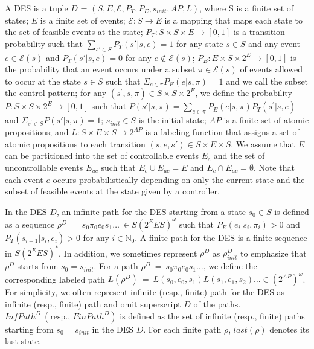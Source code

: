 \begin{definition}
A DES is a tuple $D$ = $(S, E, \mathcal{E}, P_T, P_E, s_{init}, AP, L)$, where S is a finite set of states; $E$ is a finite set of events; $\mathcal{E} : S \rightarrow E$ is a mapping that maps each state to the set of feasible events at the state; $P_T:S \times S \times E \rightarrow [0,1]$ is a transition probability such that $\sum_{s' \in S} P_T(s'|s,e) = 1$ for any state $s \in S$ and any event $e \in \mathcal{E}(s) $ and $P_T(s'|s,e) = 0$ for any $e \notin \mathcal{E}(s)$; $P_E : E \times S \times 2^E \rightarrow [0,1]$ is the probability that an event occurs under a subset $\pi \in \mathcal{E}(s)$ of events allowed to occur at the state $s \in S$ such that $\Sigma_{e \in \pi} P_E(e|s,\pi) = 1$ and we call the subset the control pattern; for any $(s^{\prime}, s, \pi) \in S \times S \times 2^E$, we define the probability $P : S \times S \times 2^{E} \rightarrow [0,1]$ such that $P(s'|s,\pi) = \sum_{e \in \pi}P_E(e|s,\pi) P_T(s^{\prime}|s,e)$ and $\Sigma_{s^{\prime} \in S} P(s'|s,\pi) = 1$; $s_{init} \in S$ is the initial state; $AP$ is a finite set of atomic propositions; and $L : S \times E \times S \rightarrow 2^{AP}$ is a labeling function that assigns a set of atomic propositions to each transition $(s, e, s') \in S \times E \times S$. We assume that $E$ can be partitioned into the set of controllable events $E_c$ and the set of uncontrollable events $E_{uc}$ such that $E_c \cup E_{uc} = E$ and $E_c \cap E_{uc} = \emptyset$. Note that each event $e$ occurs probabilistically depending on only the current state and the subset of feasible events at the state given by a controller.



In the DES $D$, an infinite path for the DES starting from a state $s_0 \in S$ is defined as a sequence $\rho^D\ =\ s_0\pi_0e_0s_1 \ldots\ \in S (2^E E S)^{\omega}$ such that $P_E(e_i|s_i, \pi_i) > 0$ and $P_T(s_{i+1}|s_i, e_i) > 0$ for any $ i \in \mathbb{N}_0$. A finite path for the DES is a finite sequence in $S (2^E E S)^*$. In addition, we sometimes represent $\rho^D$ as $\rho^D_{init}$ to emphasize that $\rho^D$ starts from $s_0 = s_{init}$.
For a path $\rho^D\ =\ s_0\pi_0e_0s_1 \ldots$, we define the corresponding labeled path $L(\rho^D)\ =\ L(s_0,e_0,s_1)L(s_1,e_1,s_2) \ldots \in (2^{AP})^{\omega}$.
For simplicity, we often represent infinite (resp., finite) path for the DES as infinite (resp., finite) path and omit superscript $D$ of the paths.
 $InfPath^{D}\ ( \text{resp., }FinPath^{D})$ is defined as the set of infinite (resp., finite) paths starting from $s_0=s_{init}$ in the DES $D$. For each finite path $\rho$, $last(\rho)$ denotes its last state.
\end{definition}

